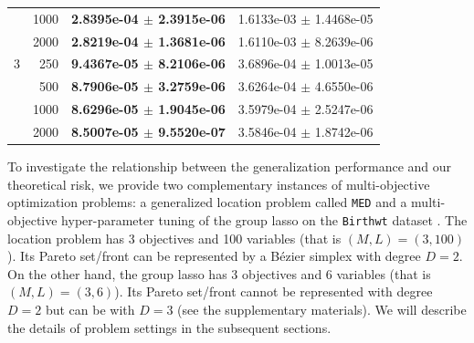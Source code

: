 \documentclass[letterpaper]{article} %
\theoremstyle{plain}
\begin{document}
\begin{table}[t]
{{\begin{tabular}{crcc}
          & 1000     &\textbf{2.8395e-04 $\pm$ 2.3915e-06}      &1.6133e-03 $\pm$ 1.4468e-05 \\
          & 2000     &\textbf{2.8219e-04 $\pm$ 1.3681e-06}      &1.6110e-03 $\pm$ 8.2639e-06 \\
        \midrule
        3 & 250      &\textbf{9.4367e-05 $\pm$ 8.2106e-06}      &3.6896e-04 $\pm$ 1.0013e-05 \\
          & 500      &\textbf{8.7906e-05 $\pm$ 3.2759e-06}      &3.6264e-04 $\pm$ 4.6550e-06 \\
          & 1000     &\textbf{8.6296e-05 $\pm$ 1.9045e-06}      &3.5979e-04 $\pm$ 2.5247e-06 \\
          & 2000     &\textbf{8.5007e-05 $\pm$ 9.5520e-07}      &3.5846e-04 $\pm$ 1.8742e-06 \\
        \bottomrule
        \end{tabular}
        }
        \label{tab:group-lasso_pareto-set}
    }
\end{table}

To investigate the relationship between the generalization performance and our theoretical risk, we provide two complementary instances of multi-objective optimization problems: a generalized location problem called \texttt{MED} \cite{Harada2006,Hamada2010} and a multi-objective hyper-parameter tuning of the group lasso \cite{Yuan2006} on the \texttt{Birthwt} dataset \cite{Hosmer1989,Venables2002}.
The location problem has 3 objectives and 100 variables (that is $(M, L) = (3, 100)$).
Its Pareto set/front can be represented by a B\'ezier simplex with degree $D = 2$.
On the other hand, the group lasso has 3 objectives and 6 variables (that is $(M, L) = (3, 6)$).
Its Pareto set/front cannot be represented with degree $D = 2$ but can be with $D = 3$ (see the supplementary materials). %
We will describe the details of problem settings in the subsequent sections.


\end{document}
